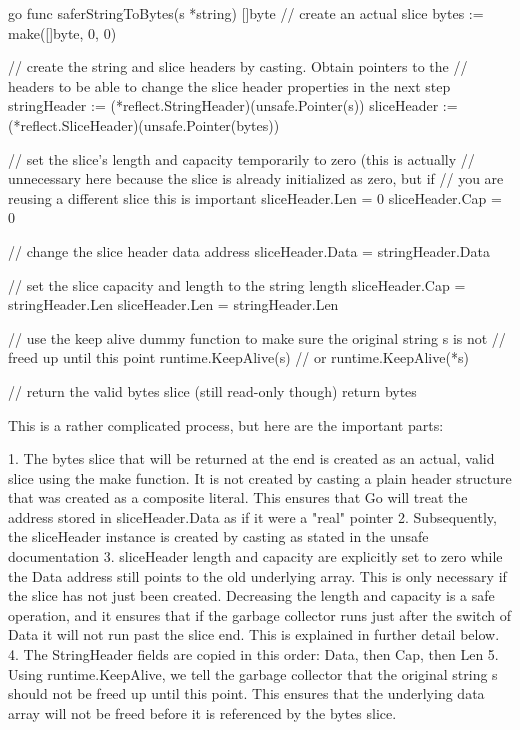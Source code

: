         go
        func saferStringToBytes(s *string) []byte
        // create an actual slice
        bytes := make([]byte, 0, 0)

        // create the string and slice headers by casting. Obtain pointers to the
        // headers to be able to change the slice header properties in the next step
        stringHeader := (*reflect.StringHeader)(unsafe.Pointer(s))
        sliceHeader := (*reflect.SliceHeader)(unsafe.Pointer(bytes))

        // set the slice's length and capacity temporarily to zero (this is actually
        // unnecessary here because the slice is already initialized as zero, but if
        // you are reusing a different slice this is important
        sliceHeader.Len = 0
        sliceHeader.Cap = 0

        // change the slice header data address
        sliceHeader.Data = stringHeader.Data

        // set the slice capacity and length to the string length
        sliceHeader.Cap = stringHeader.Len
        sliceHeader.Len = stringHeader.Len

        // use the keep alive dummy function to make sure the original string s is not
        // freed up until this point
        runtime.KeepAlive(s)  // or runtime.KeepAlive(*s)

        // return the valid bytes slice (still read-only though)
        return bytes



        This is a rather complicated process, but here are the important parts:

        1. The bytes slice that will be returned at the end is created as an actual, valid slice using the make function.
        It is not created by casting a plain header structure that was created as a composite literal. This ensures that
        Go will treat the address stored in sliceHeader.Data as if it were a "real" pointer
        2. Subsequently, the sliceHeader instance is created by casting as stated in the unsafe documentation
        3. sliceHeader length and capacity are explicitly set to zero while the Data address still points to the old
        underlying array. This is only necessary if the slice has not just been created. Decreasing the length and capacity
        is a safe operation, and it ensures that if the garbage collector runs just after the switch of Data it will not
        run past the slice end. This is explained in further detail below.
        4. The StringHeader fields are copied in this order: Data, then Cap, then Len
        5. Using runtime.KeepAlive, we tell the garbage collector that the original string s should not be freed up until
        this point. This ensures that the underlying data array will not be freed before it is referenced by the
        bytes slice.

